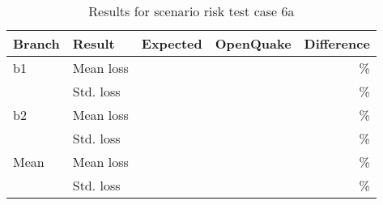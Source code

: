 \begin{table}[htbp]

\centering
\begin{tabular}{ l l r r r }

\hline
\rowcolor{anti-flashwhite}
\bf{Branch} & \bf{Result} & \bf{Expected} & \bf{OpenQuake} & \bf{Difference}\\
\hline
b1 & Mean loss &  &  & \% \\
   & Std. loss &  &  & \% \\
\hline
b2 & Mean loss &  &  & \% \\
   & Std. loss &  &  & \% \\
\hline
Mean & Mean loss &  &  & \% \\
     & Std. loss &  &  & \% \\
\hline
\end{tabular}

\caption{Results for scenario risk test case 6a}
\label{tab:result-scenario-risk-6a}
\end{table}